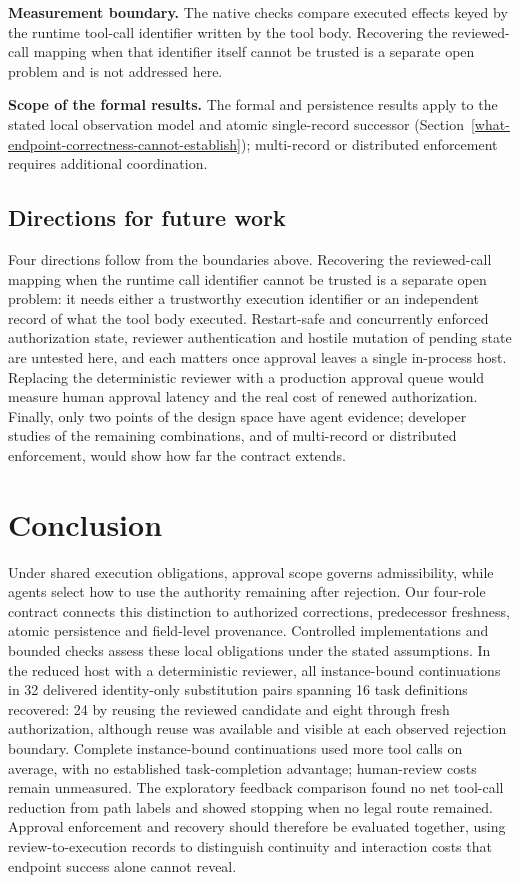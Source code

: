\documentclass[pdflatex,sn-basic]{sn-jnl}
\begin{document}
\textbf{Measurement boundary.} The native checks compare executed effects keyed by the runtime tool-call identifier written by the tool body. Recovering the reviewed-call mapping when that identifier itself cannot be trusted is a separate open problem and is not addressed here.

\textbf{Scope of the formal results.} The formal and persistence results apply to the stated local observation model and atomic single-record successor (Section~\ref{what-endpoint-correctness-cannot-establish}); multi-record or distributed enforcement requires additional coordination.

\subsection{Directions for future work}\label{future-work}

Four directions follow from the boundaries above. Recovering the reviewed-call mapping when the runtime call identifier cannot be trusted is a separate open problem: it needs either a trustworthy execution identifier or an independent record of what the tool body executed. Restart-safe and concurrently enforced authorization state, reviewer authentication and hostile mutation of pending state are untested here, and each matters once approval leaves a single in-process host. Replacing the deterministic reviewer with a production approval queue would measure human approval latency and the real cost of renewed authorization. Finally, only two points of the design space have agent evidence; developer studies of the remaining combinations, and of multi-record or distributed enforcement, would show how far the contract extends.

\section{Conclusion}\label{conclusion}

Under shared execution obligations, approval scope governs admissibility, while agents select how to use the authority remaining after rejection. Our four-role contract connects this distinction to authorized corrections, predecessor freshness, atomic persistence and field-level provenance. Controlled implementations and bounded checks assess these local obligations under the stated assumptions. In the reduced host with a deterministic reviewer, all instance-bound continuations in 32 delivered identity-only substitution pairs spanning 16 task definitions recovered: 24 by reusing the reviewed candidate and eight through fresh authorization, although reuse was available and visible at each observed rejection boundary. Complete instance-bound continuations used more tool calls on average, with no established task-completion advantage; human-review costs remain unmeasured. The exploratory feedback comparison found no net tool-call reduction from path labels and showed stopping when no legal route remained. Approval enforcement and recovery should therefore be evaluated together, using review-to-execution records to distinguish continuity and interaction costs that endpoint success alone cannot reveal.
\end{document}
